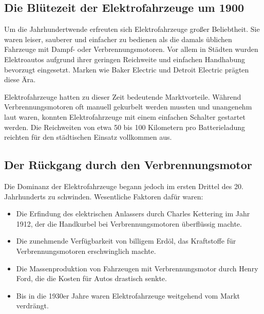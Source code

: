 \subsection*{Die Blütezeit der Elektrofahrzeuge um 1900}

Um die Jahrhundertwende erfreuten sich Elektrofahrzeuge großer Beliebtheit. Sie waren leiser, sauberer und einfacher zu bedienen als die damals üblichen Fahrzeuge mit Dampf- oder Verbrennungsmotoren. Vor allem in Städten wurden Elektroautos aufgrund ihrer geringen Reichweite und einfachen Handhabung bevorzugt eingesetzt. \autocite{energyprofi_elektromobile_geschichte} Marken wie Baker Electric und Detroit Electric prägten diese Ära. \autocite{einfacheauto_elektroauto_geschichte}

Elektrofahrzeuge hatten zu dieser Zeit bedeutende Marktvorteile. Während Verbrennungsmotoren oft manuell gekurbelt werden mussten und unangenehm laut waren, konnten Elektrofahrzeuge mit einem einfachen Schalter gestartet werden. \autocite{enbw_elektroautos_vorteile_nachteile} Die Reichweiten von etwa 50 bis 100 Kilometern pro Batterieladung reichten für den städtischen Einsatz vollkommen aus. \autocite{adac_stromverbrauch_elektroautos}
\clearpage

\subsection*{Der Rückgang durch den Verbrennungsmotor}

Die Dominanz der Elektrofahrzeuge begann jedoch im ersten Drittel des 20. Jahrhunderts zu schwinden. Wesentliche Faktoren dafür waren:
\begin{itemize}
	\item Die Erfindung des elektrischen Anlassers durch Charles Kettering im Jahr 1912, der die Handkurbel bei Verbrennungsmotoren überflüssig machte. \autocite{greelane_charles_kettering}
	\item Die zunehmende Verfügbarkeit von billigem Erdöl, das Kraftstoffe für Verbrennungsmotoren erschwinglich machte. \autocite{tanke_guenstig_oelpreise}
	\item Die Massenproduktion von Fahrzeugen mit Verbrennungsmotor durch Henry Ford, die die Kosten für Autos drastisch senkte. \autocite{ardalpha_henry_ford_geschichte}
	\item Bis in die 1930er Jahre waren Elektrofahrzeuge weitgehend vom Markt verdrängt. \autocite{ardalpha_henry_ford_geschichte}
\end{itemize}

